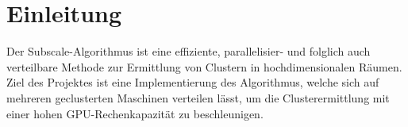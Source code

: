 \section{Einleitung}
Der Subscale-Algorithmus ist eine effiziente, parallelisier- und folglich auch verteilbare Methode zur Ermittlung von
Clustern in hochdimensionalen Räumen. Ziel des Projektes ist eine Implementierung des Algorithmus, welche sich auf
mehreren geclusterten Maschinen verteilen lässt, um die Clusterermittlung mit einer hohen GPU-Rechenkapazität zu
beschleunigen.
